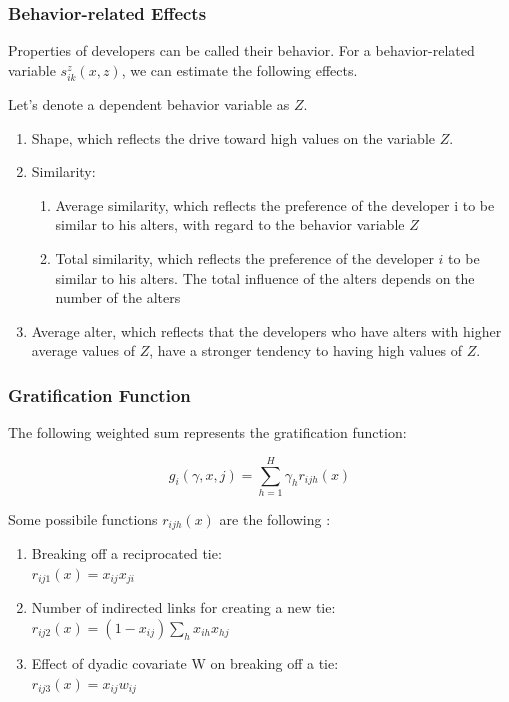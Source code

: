 \documentclass[12pt,letterpaper]{gthesis2}  %
\begin{document}
\subsubsection{Behavior-related Effects\\}
Properties of developers can be called their behavior. For a behavior-related variable $s_{ik}^z(x,z)$, we can estimate the following effects.

Let's denote a dependent behavior variable as $Z$.
\begin{enumerate}
\item{Shape, which reflects the drive toward high values on the variable $Z$.}
\item{Similarity:}
\begin{enumerate}
\item{Average similarity, which reflects the preference of the developer i to be similar to his alters, with regard to the behavior variable $Z$}
\item{Total similarity, which reflects the preference of the developer $i$ to be similar to his alters. The total influence of the alters depends on the number of the alters}
\end{enumerate}
\item{Average alter, which reflects that the developers who have alters with higher average values of $Z$, have a stronger tendency to having high values of $Z$.}
\end{enumerate}

\subsubsection*{Gratification Function}
The following weighted sum represents the gratification function:

\begin{equation}
g_i(\gamma, x, j) = \sum_{h = 1}^{H} \gamma_h r_{ijh}(x)
\end{equation}

Some possibile functions $r_{ijh}(x)$ are the following \cite{Snijders2004}:
\begin{enumerate}
\item Breaking off a reciprocated tie:\\ 
$r_{ij1}(x) = x_{ij} x_{ji}$
\item Number of indirected links for creating a new tie:\\ $r_{ij2}(x) = (1 - x_{ij}) \sum_h x_{ih} x_{hj}$
\item Effect of dyadic covariate W on breaking off a tie:\\
$r_{ij3}(x) = x_{ij}w_{ij}$
\end{enumerate}
\end{document}
